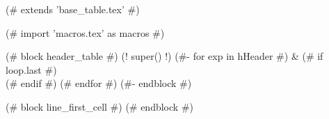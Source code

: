(# extends 'base_table.tex' #)

(# import 'macros.tex' as macros #)


(# block header_table #)
(! super() !)
(#- for exp in hHeader #)
&  (# if loop.last #) \\ (# endif #)
(# endfor #)
(#- endblock #)


(# block line_first_cell #)
(# endblock #)




